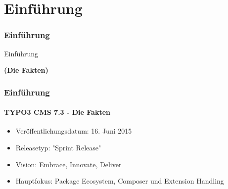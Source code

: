%

\section{Einführung}
\begin{frame}[fragile]
	\frametitle{Einführung}

	\begin{center}\huge{Einführung}\end{center}
	\begin{center}\huge{\color{typo3darkgrey}\textbf{(Die Fakten)}}\end{center}

\end{frame}

\begin{frame}[fragile]
	\frametitle{Einführung}
	\framesubtitle{TYPO3 CMS 7.3 - Die Fakten}

	\begin{itemize}
		\item Veröffentlichungsdatum: 16. Juni 2015
		\item Releasetyp: "Sprint Release"
		\item Vision: Embrace, Innovate, Deliver
		\item Hauptfokus: Package Ecosystem, Composer und Extension Handling
	\end{itemize}

\end{frame}

